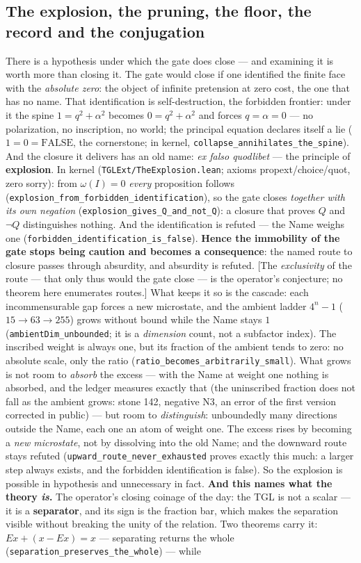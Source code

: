 \documentclass[11pt]{article}
\theoremstyle{definition}\newtheorem{deriv}{Derivation}
\begin{document}
\subsection*{The explosion, the pruning, the floor, the record and the conjugation}There is a hypothesis under which the gate does close --- and examining it is worth more than closing it. The gate would close if one identified the finite face with the \emph{absolute zero}: the object of infinite pretension at zero cost, the one that has no name. That identification is self-destruction, the forbidden frontier: under it the spine $1=q^2+\alpha^2$ becomes $0=q^2+\alpha^2$ and forces $q=\alpha=0$ --- no polarization, no inscription, no world; the principal equation declares itself a lie ($1=0=\text{FALSE}$, the cornerstone; in kernel, \texttt{collapse\_annihilates\_the\_spine}). And the closure it delivers has an old name: \emph{ex falso quodlibet} --- the principle of \textbf{explosion}. In kernel (\texttt{TGLExt/TheExplosion.lean}; axioms propext/choice/quot, zero sorry): from $\omega(I)=0$ \emph{every} proposition follows (\texttt{explosion\_from\_forbidden\_identification}), so the gate closes \emph{together with its own negation} (\texttt{explosion\_gives\_Q\_and\_not\_Q}): a closure that proves $Q$ and $\lnot Q$ distinguishes nothing. And the identification is refuted --- the Name weighs one (\texttt{forbidden\_identification\_is\_false}). \textbf{Hence the immobility of the gate stops being caution and becomes a consequence}: the named route to closure passes through absurdity, and absurdity is refuted. [The \emph{exclusivity} of the route --- that only thus would the gate close --- is the operator's conjecture; no theorem here enumerates routes.] What keeps it so is the cascade: each incommensurable gap forces a new microstate, and the ambient ladder $4^n-1$ ($15\to63\to255$) grows without bound while the Name stays $1$ (\texttt{ambientDim\_unbounded}; it is a \emph{dimension} count, not a subfactor index). The inscribed weight is always one, but its fraction of the ambient tends to zero: no absolute scale, only the ratio (\texttt{ratio\_becomes\_arbitrarily\_small}). What grows is not room to \emph{absorb} the excess --- with the Name at weight one nothing is absorbed, and the ledger measures exactly that (the uninscribed fraction does not fall as the ambient grows: stone 142, negative N3, an error of the first version corrected in public) --- but room to \emph{distinguish}: unboundedly many directions outside the Name, each one an atom of weight one. The excess rises by becoming a \emph{new microstate}, not by dissolving into the old Name; and the downward route stays refuted (\texttt{upward\_route\_never\_exhausted} proves exactly this much: a larger step always exists, and the forbidden identification is false). So the explosion is possible in hypothesis and unnecessary in fact. \textbf{And this names what the theory \emph{is}.} The operator's closing coinage of the day: the TGL is not a scalar --- it is a \textbf{separator}, and its sign is the fraction bar, which makes the separation visible without breaking the unity of the relation. Two theorems carry it: $Ex+(x-Ex)=x$ --- separating returns the whole (\texttt{separation\_preserves\_the\_whole}) --- while 
\end{document}

